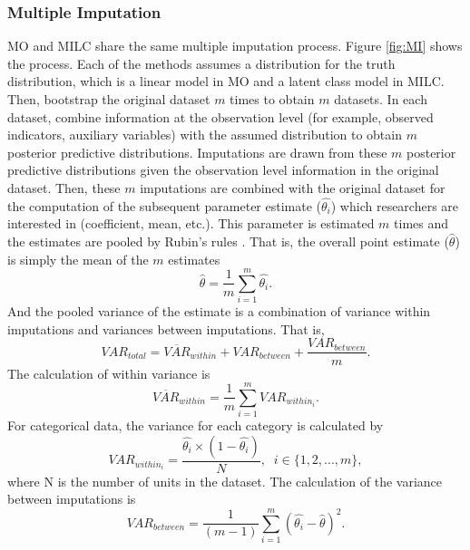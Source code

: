 \documentclass[oneside,a4paper]{article}
\begin{document}
\subsubsection*{Multiple Imputation}
MO and MILC share the same multiple imputation process. Figure \ref{fig:MI} shows the process. Each of the methods assumes a distribution for the truth distribution, which is a linear model in MO and a latent class model in MILC.  Then, bootstrap the original dataset $m$ times to obtain $m$ datasets. In each dataset, combine information at the observation level (for example, observed indicators, auxiliary variables) with the assumed distribution to obtain $m$ posterior predictive distributions. Imputations are drawn from these $m$ posterior predictive distributions given the observation level information in the original dataset. Then, these $m$ imputations are combined with the original dataset for the computation of the subsequent parameter estimate ($\hat{\theta_i}$) which researchers are interested in (coefficient, mean, etc.). This parameter is estimated $m$ times and the estimates are pooled by Rubin’s rules \cite{Rubin1978}. That is, the overall point estimate ($\hat{\theta}$) is simply the mean of the $m$ estimates 
\begin{equation}
\hat{\theta}=\frac{1}{m}\sum_{i=1}^{m}\hat{\theta_i}.
\end{equation}
And the pooled variance of the estimate is a combination of variance within imputations and variances between imputations. That is,  
\begin{equation}
VAR_{total}=\overline{VAR}_{within}+VAR_{between}+\frac{VAR_{between}}{m}.
\end{equation}
The calculation of within variance is
\begin{equation}
\overline{VAR}_{within}=\frac{1}{m}\sum_{i=1}^{m}VAR_{within_i}.
\end{equation}
For categorical data, the variance for each category is calculated by
\begin{equation}
VAR_{within_i}=\frac{\hat{\theta_i} \times(1-\hat{\theta_i})}{N},\; \;
i \in\{1, 2, ...,m\},
\end{equation}
where N is the number of units in the dataset. The calculation of the variance between imputations is
\begin{equation}
VAR_{between}=\frac{1}{(m-1)}\sum_{i=1}^m(\hat{\theta_i}-\hat{\theta})^2.
\end{equation}
\end{document}
